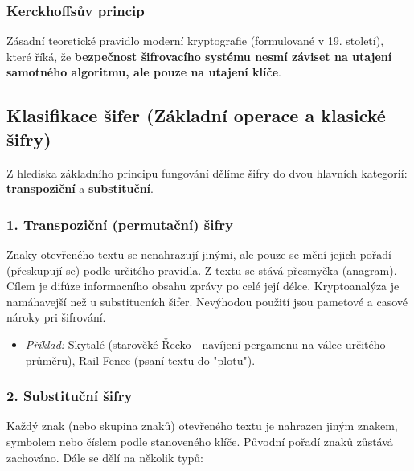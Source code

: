 \subsubsection*{Kerckhoffsův princip}
Zásadní teoretické pravidlo moderní kryptografie (formulované v 19. století), které říká, že \textbf{bezpečnost šifrovacího systému nesmí záviset na utajení samotného algoritmu, ale pouze na utajení klíče}. 

\subsection{Klasifikace šifer (Základní operace a klasické šifry)}

Z hlediska základního principu fungování dělíme šifry do dvou hlavních kategorií: \textbf{transpoziční} a \textbf{substituční}.

\subsubsection*{1. Transpoziční (permutační) šifry}
Znaky otevřeného textu se nenahrazují jinými, ale pouze se mění jejich pořadí (přeskupují se) podle určitého pravidla. Z textu se stává přesmyčka (anagram).
Cílem je difúze informacního obsahu zprávy po celé její délce.
Kryptoanalýza je namáhavejší než u substitucních šifer.
Nevýhodou použití jsou pametové a casové nároky pri šifrování.
\begin{itemize}
    \item \textit{Příklad:} Skytalé (starověké Řecko - navíjení pergamenu na válec určitého průměru), Rail Fence (psaní textu do "plotu").
\end{itemize}

\subsubsection*{2. Substituční šifry}
Každý znak (nebo skupina znaků) otevřeného textu je nahrazen jiným znakem, symbolem nebo číslem podle stanoveného klíče. Původní pořadí znaků zůstává zachováno. Dále se dělí na několik typů:

